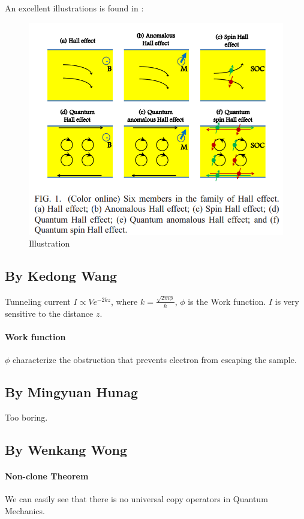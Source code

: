 \documentclass{article}
\numberwithin{equation}{subsection} %
\theoremstyle{definition}
\begin{document}
    An excellent illustrations is found in \cite{Arxiv-Xiao}:
    \begin{figure}[H]
        \centering
        \includegraphics[width=0.8\linewidth]{pics/1}
        \caption{Illustration}
        \label{fig:Xiao Illustration}
    \end{figure}

    \subsection{By Kedong Wang}
    Tunneling current $I\propto V e^{-2kz}$, where 
    $k = \frac{\sqrt{2m\phi}}{\hbar}$, $\phi$ is the Work function.
    $I$ is very sensitive to the distance $z$.
    
    \paragraph{Work function} $\phi$ characterize the obstruction
    that prevents electron from escaping the sample.

    \subsection{By Mingyuan Hunag}
    Too boring.
    
    \subsection{By Wenkang Wong}
    \paragraph{Non-clone Theorem} We can easily see that there is no universal
    copy operators in Quantum Mechanics.
\end{document}
